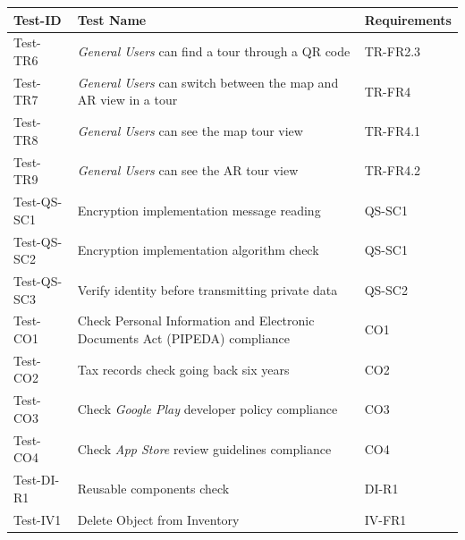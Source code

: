 \documentclass[12pt, titlepage]{article}
\begin{document}
\begin{table}[htpb!]
  \centering
  \begin{tabular}{|l|p{8cm}|p{3cm}|}
    \hline
    \textbf{Test-ID} & \textbf{Test Name}                                                          & \textbf{Requirements} \\
    \hline
    Test-TR6         & \textit{General Users} can find a tour through a QR code                    & TR-FR2.3              \\
    \hline
    Test-TR7         & \textit{General Users} can switch between the map and AR view in a tour     & TR-FR4                \\
    \hline
    Test-TR8         & \textit{General Users} can see the map tour view                            & TR-FR4.1              \\
    \hline
    Test-TR9         & \textit{General Users} can see the AR tour view                             & TR-FR4.2              \\
    \hline
    Test-QS-SC1      & Encryption implementation message reading                                   & QS-SC1                \\
    \hline
    Test-QS-SC2      & Encryption implementation algorithm check                                   & QS-SC1                \\
    \hline
    Test-QS-SC3      & Verify identity before transmitting private data                            & QS-SC2                \\
    \hline
    Test-CO1         & Check Personal Information and Electronic Documents Act (PIPEDA) compliance & CO1                   \\
    \hline
    Test-CO2         & Tax records check going back six years                                      & CO2                   \\
    \hline
    Test-CO3         & Check \textit{Google Play} developer policy compliance                      & CO3                   \\
    \hline
    Test-CO4         & Check \textit{App Store} review guidelines compliance                       & CO4                   \\
    \hline
    Test-DI-R1       & Reusable components check                                                   & DI-R1                 \\
    \hline
    Test-IV1         & Delete Object from Inventory                                                & IV-FR1                \\

\end{tabular}
\end{table}
\end{document}
